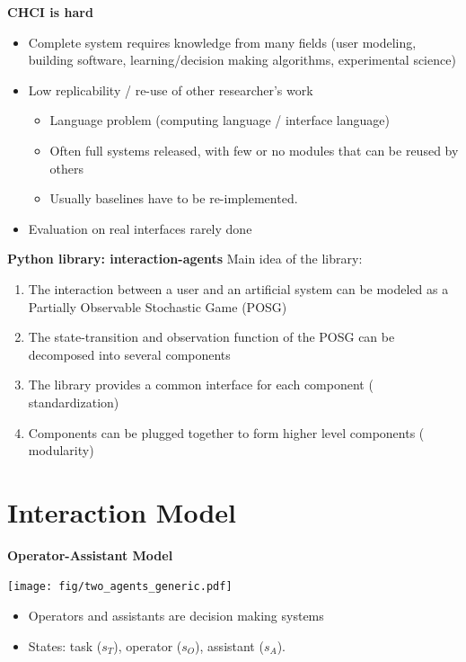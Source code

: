 \documentclass[11pt, xcolor = {dvipsnames}]{beamer}
\newcommand{\bmf}[1]{{\usebeamercolor[fg]{title} #1}}
\begin{document}
\begin{frame}{\textbf{CHCI is hard}}
\begin{itemize}
\item Complete system requires knowledge from many fields (user modeling, building software, learning/decision making algorithms, experimental science)
\item Low replicability / re-use of other researcher's work
	\begin{itemize}
		\item Language problem (computing language / interface language)
		\item Often full systems released, with few or no modules that can be reused by others
		\item Usually baselines have to be re-implemented.
	\end{itemize}
\item Evaluation on real interfaces rarely done
\end{itemize}

\end{frame}


\begin{frame}{\textbf{Python library: interaction-agents}}
Main idea of the library:
\begin{enumerate}
\item The interaction between a user and an artificial system can be modeled as a Partially Observable Stochastic Game (POSG)
\item The state-transition and observation function of the POSG can be decomposed into several components
\item The library provides a common interface for each component (\bmf{standardization})
\item Components can be plugged together to form higher level components (\bmf{modularity})
\end{enumerate}

\end{frame}

\section{Interaction Model}


\begin{frame}{\textbf{Operator-Assistant Model}}
\begin{minipage}{.6\textwidth}
\texttt{[image: fig/two\_agents\_generic.pdf]} 
\end{minipage}
\begin{minipage}{.38\textwidth}
\begin{itemize}
\item Operators and assistants are decision making systems
\item States: task ($s_T$), operator ($s_O$), assistant ($s_A$).
\end{itemize}
\end{minipage}
\end{frame}
\end{document}
